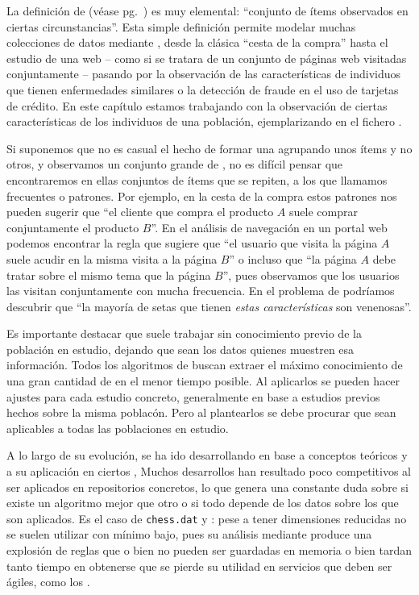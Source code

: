 \ABIERTO
La definición de \transaccion (véase pg.~\pageref{def:1:3:2:transaccion}) es muy elemental: ``conjunto de ítems observados en ciertas circunstancias''. Esta simple definición permite modelar muchas colecciones de datos mediante \transacciones, desde la clásica ``cesta de la compra'' hasta el estudio de una \sn web -- como si se tratara de un conjunto de páginas web visitadas conjuntamente -- pasando por la observación de las características de individuos que tienen enfermedades similares o la detección de fraude en el uso de tarjetas de crédito. En este capítulo estamos trabajando con la observación de ciertas características de los individuos de una población, ejemplarizando en el fichero \mushroom.

Si suponemos que no es casual el hecho de formar una \transaccion agrupando unos ítems y no otros, y observamos un conjunto grande de \transacciones, no es difícil pensar que encontraremos en ellas conjuntos de ítems que se repiten, a los que llamamos \itemsets frecuentes o patrones. Por ejemplo, en la cesta de la compra estos patrones nos pueden sugerir que ``el cliente que compra el producto $A$ suele comprar conjuntamente el producto $B$''. En el análisis de navegación en un portal web podemos encontrar la regla que sugiere que ``el usuario que visita la página $A$ suele acudir en la misma visita a la página $B$'' o incluso que ``la página $A$ debe tratar sobre el mismo tema que la página $B$'', pues observamos que los usuarios las visitan conjuntamente con mucha frecuencia. En el problema de \clasificacion podríamos descubrir que ``la mayoría de setas que tienen \emph{estas características} son venenosas''.

Es importante destacar que \ARM suele trabajar sin conocimiento previo de la población en estudio, dejando que sean los datos quienes muestren esa información. Todos los algoritmos de \ARM buscan extraer el máximo conocimiento de una gran cantidad de \transacciones en el menor tiempo posible. Al aplicarlos se pueden hacer ajustes para cada estudio concreto, generalmente en base a estudios previos hechos sobre la misma poblacón. Pero al plantearlos se debe procurar que sean aplicables a todas las poblaciones en estudio.

A lo largo de su evolución, \ARM se ha ido desarrollando en base a conceptos teóricos y a su aplicación en ciertos \datasets, Muchos desarrollos han resultado poco competitivos al ser aplicados en repositorios concretos, lo que genera una constante duda sobre si existe un algoritmo mejor que otro o si todo depende de los datos sobre los que son aplicados. Es el caso de \texttt{chess.dat} y \mushroom: pese a tener dimensiones reducidas no se suelen utilizar con \soporte mínimo bajo, pues su análisis mediante \ARM produce una explosión de reglas que o bien no pueden ser guardadas en memoria o bien tardan tanto tiempo en obtenerse que se pierde su utilidad en servicios que deben ser ágiles, como los \sr.

